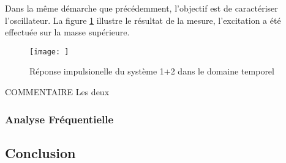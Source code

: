 Dans la même démarche que précédemment, l'objectif est de caractériser l'oscillateur. 
La figure \ref{fig:rep temps 1+2} illustre le résultat de la mesure, l'excitation a été effectuée sur la masse supérieure.

\begin{figure}
    \centering
    \texttt{[image: ]}
    \caption{Réponse impulsionelle du système 1+2 dans le domaine temporel}
    \label{fig:rep temps 1+2}
\end{figure}

COMMENTAIRE
Les deux 

\subsubsection{Analyse Fréquentielle}

\subsection{Conclusion}


